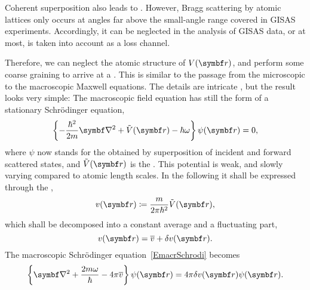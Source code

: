 Coherent superposition also leads to .
%
However, Bragg scattering by atomic lattices only occurs at angles
far above the small-angle range covered in GISAS experiments.
Accordingly, it can be neglected in the analysis of GISAS data,
or at most, is taken into account as a loss channel.

Therefore,
we can neglect the atomic structure of $V(\r)$,
and perform some coarse graining to
arrive at a .
%
This is
similar to the passage from
the microscopic to the macroscopic Maxwell equations.
The details are intricate \cite{Sea89,Lax51},
but the result \cite[eq.~2.8.32]{Sea89} looks very simple:
The macroscopic field equation
has still the form of a stationary Schrödinger equation,
%
\begin{equation}\label{EmacrSchrodi}
  \left\{-\frac{\hbar^2}{2m}\Nabla^2+\Vmac(\r)-\hbar\omega\right\} \psi(\r) = 0,
\end{equation}
%
%
where $\psi$ now stands for the 
%
%
obtained by superposition of
incident and forward scattered states,
and $\Vmac(\r)$ is the .
%
This potential is weak, and slowly varying compared to atomic length scales.
In the following it shall be expressed through the
%
%
\cite[eq.\ 2.8.37]{Sea89},
%
\begin{equation}
  v(\r)\coloneqq\frac{m}{2\pi \hbar^2}\Vmac(\r),
\end{equation}
which shall be decomposed into a constant average and a fluctuating part,
\begin{equation}\label{Edecompose_v}
  v(\r) = \overline{v} + \delta v(\r).
\end{equation}
%
%
The macroscopic Schrödinger equation~\cref{EmacrSchrodi} becomes
\begin{equation}\label{ESchrodi3}
  \left\{ \Nabla^2 + \frac{2m\omega}{\hbar} - 4\pi\overline{v} \right\}\psi(\r)
  = 4\pi\delta v(\r)\psi(\r).
\end{equation}

